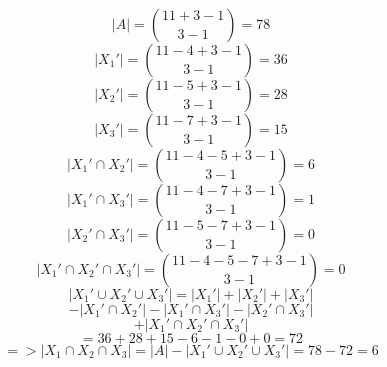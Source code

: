 \begin{PROBLEM}
{        $$|A| = \binom{11+3-1}{3-1} = 78 $$
        $$|X_1'| = \binom{11-4+3-1}{3-1} = 36 $$
        $$|X_2'| = \binom{11-5+3-1}{3-1} = 28 $$
        $$|X_3'| = \binom{11-7+3-1}{3-1} = 15 $$
        $$|X_1' \cap X_2'| = \binom{11-4-5+3-1}{3-1} = 6 $$
        $$|X_1' \cap X_3'| = \binom{11-4-7+3-1}{3-1} = 1 $$
        $$|X_2' \cap X_3'| = \binom{11-5-7+3-1}{3-1} = 0 $$
        $$|X_1' \cap X_2' \cap X_3'| = \binom{11-4-5-7+3-1}{3-1} = 0 $$
        $$|X_1' \cup X_2' \cup X_3'| = |X_1'| + |X_2'| + |X_3'|$$
        $$- |X_1' \cap X_2'| - |X_1' \cap X_3'| - |X_2' \cap X_3'|$$
        $$+ |X_1' \cap X_2' \cap X_3'|$$ 
        $$= 36 + 28 + 15 - 6 - 1 - 0 + 0 = 72 $$
        $$=> |X_1 \cap X_2 \cap X_3| = |A| - |X_1' \cup X_2' \cup X_3'| = 78 - 72 = 6 $$
    }
  
\end{PROBLEM}